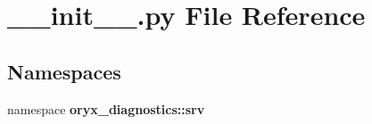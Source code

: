 \section{\-\_\-\-\_\-init\-\_\-\-\_\-.\-py \-File \-Reference}
\label{srv_2____init_____8py}
\subsection*{\-Namespaces}
\begin{DoxyCompactItemize}
\item 
namespace {\bf oryx\-\_\-diagnostics\-::srv}
\end{DoxyCompactItemize}
